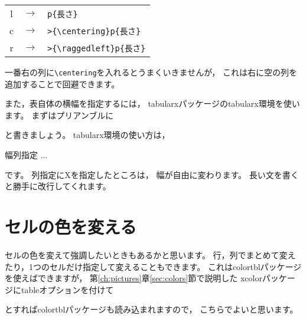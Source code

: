 \begin{tabular}{ccl}
l & $\rightarrow$ & \verb|p{長さ}| \\
c & $\rightarrow$ & \verb|>{\centering}p{長さ}| \\
r & $\rightarrow$ & \verb|>{\raggedleft}p{長さ}| \\
\end{tabular}

一番右の列に\verb|\centering|を入れるとうまくいきませんが，
これは右に空の列を追加することで回避できます。

また，表自体の横幅を指定するには，
tabularxパッケージのtabularx環境を使います。
まずはプリアンブルに
\begin{ITeX}
\usepackage{tabularx}
\end{ITeX}
と書きましょう。
tabularx環境の使い方は，
\begin{ITeX}
\begin{tabularx}{幅}{列指定}
...
\end{tabularx}
\end{ITeX}
です。
列指定にXを指定したところは，
幅が自由に変わります。
長い文を書くと勝手に改行してくれます。




\section{セルの色を変える}
セルの色を変えて強調したいときもあるかと思います。
行，列でまとめて変えたり，1つのセルだけ指定して変えることもできます。
これはcolortblパッケージを使えばできますが，
第\ref{ch:pictures}章\ref{sec:colors}節で説明した
xcolorパッケージにtableオプションを付けて
\begin{ITeX}
\usepackage[table]{xcolor}
\end{ITeX}
とすればcolortblパッケージも読み込まれますので，
こちらでよいと思います。

